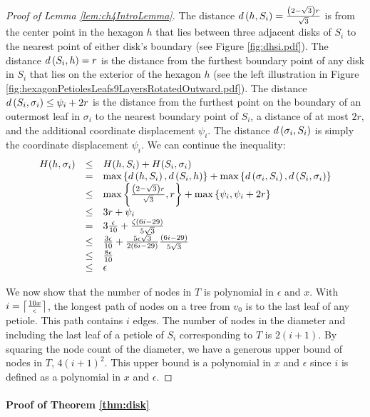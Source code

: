 \begin{proof}[Proof of Lemma \ref{lem:ch4IntroLemma}]
The distance $d\left( h,S_i \right) = \frac{\left( 2-\sqrt{3} \right)r}{\sqrt{3}}$ is from the center point in the hexagon $h$ that lies between three adjacent disks of $S_i$ to the nearest point of either disk's boundary (see Figure \ref{fig:dhsi.pdf}).  
The distance $d\left( S_i,h \right) = r$ is the distance from the furthest boundary point of any disk in $S_i$ that lies on the exterior of the hexagon $h$ (see the left illustration in Figure \ref{fig:hexagonPetiolesLeafs9LayersRotatedOutward.pdf}).  
The distance $d\left( S_i,\sigma_i \right) \leq \psi_i + 2r$  is the distance from the furthest point on the boundary of an outermost leaf in $\sigma_i$ to the nearest boundary point of $S_i$, a distance of at most $2r$, and the additional coordinate displacement $\psi_i$.  
The distance $d\left( \sigma_i,S_i \right)$ is simply the coordinate displacement $\psi_i$.  
We can continue the inequality:
$$\begin{array}{rcl}
H(h,\sigma_i) &\leq&H(h, S_i) + H(S_i, \sigma_i)\\
&=&\text{max} \left\lbrace d\left( h,S_i \right), d\left( S_i,h \right) \right\rbrace + \text{max} \left\lbrace d\left( \sigma_i,S_i \right), d\left( S_i,\sigma_i \right) \right\rbrace\\
&\leq& \text{max} \left\lbrace \frac{\left( 2-\sqrt{3} \right)r}{\sqrt{3}}, r \right\rbrace + \text{max} \left\lbrace \psi_i, \psi_i + 2r\right\rbrace\\
&\leq& 3r + \psi_i \\
&=& 3 \frac{\epsilon}{10} + \frac{\zeta(6i-29)}{5 \sqrt{3}}\\
&\leq&\frac{3\epsilon}{10} + \frac{5\epsilon  \sqrt{3}}{2(6i-29)}\frac{\left( 6i-29 \right)}{5 \sqrt{3}}\\
&\leq&\frac{8\epsilon}{10}\\
&\leq&\epsilon
\end{array}
$$

We now show that the number of nodes in $T$ is polynomial in $\epsilon$ and $x$.  
With $i = \left\lceil \frac{10x}{\epsilon} \right\rceil$, the longest path of nodes on a tree from $v_0$ is to the last leaf of any petiole.  This path contains $i$ edges.  The number of nodes in the diameter and including the last leaf of a petiole of $S_i$ corresponding to $T$ is $2(i+1)$.  By squaring the node count of the diameter, we have a generous upper bound of nodes in $T$, $4(i+1)^2$.  This upper bound is a polynomial in $x$ and $\epsilon$ since $i$ is defined as a polynomial in $x$ and $\epsilon$.

\end{proof}

\paragraph{Proof of Theorem \ref{thm:disk}}

